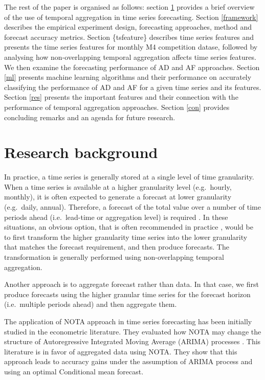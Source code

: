 \documentclass[]{elsarticle} %
\begin{document}
The rest of the paper is organised as follows: section \ref{lit}
provides a brief overview of the use of temporal aggregation in time
series forecasting. Section \ref{framework} describes the empirical
experiment design, forecasting approaches, method and forecast accuracy
metrics. Section \{tsfeature\} describes time series features and
presents the time series features for monthly M4 competition datase,
followed by analysing how non-overlapping temporal aggregation affects
time series features. We then examine the forecasting performance of AD
and AF approaches. Section \ref{ml} presents machine learning algorithms
and their performance on accurately classifying the performance of AD
and AF for a given time series and its features. Section \ref{res}
presents the important features and their connection with the
performance of temporal aggregation approaches. Section \ref{con}
provides concluding remarks and an agenda for future research.

\hypertarget{lit}{%
\section{Research background}\label{lit}}

In practice, a time series is generally stored at a single level of time
granularity. When a time series is available at a higher granularity
level (e.g.~hourly, monthly), it is often expected to generate a
forecast at lower granularity (e.g.~daily, annual). Therefore, a
forecast of the total value over a number of time periods ahead
(i.e.~lead-time or aggregation level) is required
\citep{mohammadipour2012forecast}. In these situations, an obvious
option, that is often recommended in practice \citep{goodwin2018profit},
would be to first transform the higher granularity time series into the
lower granularity that matches the forecast requirement, and then
produce forecasts. The transformation is generally performed using
non-overlapping temporal aggregation.

Another approach is to aggregate forecast rather than data. In that
case, we first produce forecasts using the higher granular time series
for the forecast horizon (i.e.~multiple periods ahead) and then
aggregate them.

The application of NOTA approach in time series forecasting has been
initially studied in the econometric literature. They evaluated how NOTA
may change the structure of Autoregressive Integrated Moving Average
(ARIMA) processes \citep{wei1978some, rossana1995temporal}. This
literature is in favor of aggregated data using NOTA. They show that
this approach leads to accuracy gains under the assumption of ARIMA
process and using an optimal Conditional mean forecast.
\end{document}
